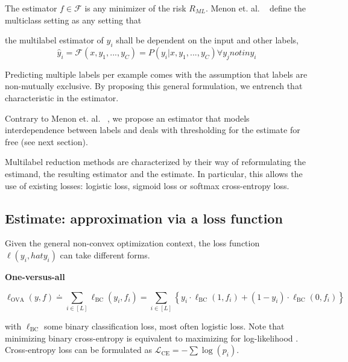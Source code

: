 The estimator $f \in \mathcal{F}$ is any minimizer of the risk $R_{ML}$. 
Menon et. al. ~\citep{multilabelReduction} define the multiclass setting as any setting that 

\begin{proposition}
the multilabel estimator of $y_i$ shall be dependent on the input and other labels,
\begin{equation}
  \hat{y}_i = \mathcal{F}(x, y_1, ..., y_C) = P(y_i | x, y_1, ..., y_C) \forall y_j not in y_i
\end{equation}
\end{proposition}

Predicting multiple labels per example comes with the assumption that labels are non-mutually exclusive. By proposing this general formulation, we entrench that characteristic in the estimator.

Contrary to Menon et. al. ~\citep{multilabelReduction}, we propose an estimator that models interdependence between labels and deals with thresholding for the estimate for free (see next section).

Multilabel reduction methods are characterized by their way of reformulating the estimand, the resulting estimator and the estimate. In particular, this allows the use of existing losses: logistic loss, sigmoid loss or softmax cross-entropy loss.


\subsection{Estimate: approximation via a loss function}
\label{section:background:estimate}

Given the general non-convex optimization context, the loss function $\ell(y_i, hat{y_i})$ can take different forms. 

\textbf{One-versus-all}

\begin{equation}
\ell_{\mathrm{OVA}}(y, f) \doteq \sum_{i \in[L]} \ell_{\mathrm{BC}}\left(y_{i}, f_{i}\right)=\sum_{i \in[L]}\left\{y_{i} \cdot \ell_{\mathrm{BC}}\left(1, f_{i}\right)+\left(1-y_{i}\right) \cdot \ell_{\mathrm{BC}}\left(0, f_{i}\right)\right\}
\end{equation}

with $\ell_{\mathrm{BC}}$ some binary classification loss, most often logistic loss.  Note that minimizing binary cross-entropy is equivalent to maximizing for log-likelihood
\cite[Section 4.3.4]{Bishop}. Cross-entropy loss can be formulated as \(\mathcal{L}_{\text {CE}}=-\sum \log \left(p_{i}\right)\).

